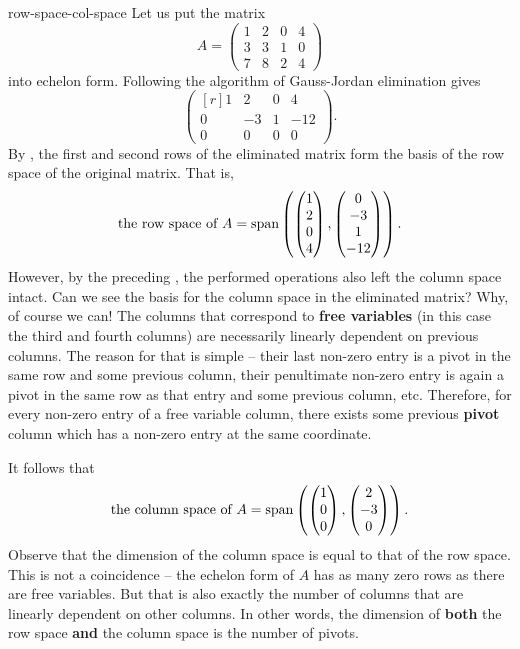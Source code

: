 \begin{example}{}{row-space-col-space}
 Let us put the matrix
 \[
  A = \begin{pmatrix}
  1 & 2 & 0 & 4\\
  3 & 3 & 1 & 0\\
  7 & 8 & 2 & 4
  \end{pmatrix}
 \]
 into echelon form. Following the algorithm of Gauss-Jordan elimination gives
 \[
  \begin{pmatrix*}[r]
   1 & 2 & 0 & 4\\
   0 & -3 & 1 & -12\\
   0 & 0 & 0 & 0
  \end{pmatrix*}.
 \]
 By , the first and second rows of the
 eliminated matrix form the basis of the row space of the original matrix. That
 is,
 \[
  \text{the row space of } A = \operatorname{span} \left( 
  \begin{pmatrix}
   1\\
   2\\
   0\\
   4
  \end{pmatrix},
  \begin{pmatrix}
   0\\
   -3\\
   1\\
   -12
  \end{pmatrix}
  \right).
 \]
 However, by the preceding , the
 performed operations also left the column space intact. Can we see the basis
 for the column space in the eliminated matrix? Why, of course we can! The
 columns that correspond to \textbf{free variables} (in this case the third and
 fourth columns) are necessarily linearly dependent on previous columns. The
 reason for that is simple -- their last non-zero entry is a pivot in the same
 row and some previous column, their penultimate non-zero entry is again a pivot
 in the same row as that entry and some previous column, etc. Therefore, for
 every non-zero entry of a free variable column, there exists some previous
 \textbf{pivot} column which has a non-zero entry at the same coordinate.

 It follows that
 \[
  \text{the column space of } A = \operatorname{span} \left(
   \begin{pmatrix}
    1\\
    0\\
    0
   \end{pmatrix},
   \begin{pmatrix}
    2\\
    -3\\
    0
   \end{pmatrix}
  \right).
 \]
 Observe that the dimension of the column space is equal to that of the row
 space. This is not a coincidence -- the echelon form of $A$ has as many zero
 rows as there are free variables. But that is also exactly the number of
 columns that are linearly dependent on other columns. In other words, the
 dimension of \textbf{both} the row space \textbf{and} the column space is the
 number of pivots.
\end{example}

